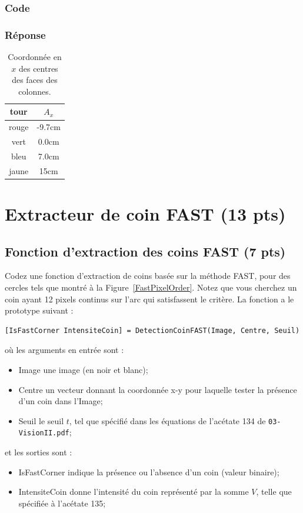 \documentclass[12pt]{article}
\begin{document}
\subsubsection{Code}
\subsubsection{Réponse}

\begin{table}[h]
\caption{Coordonnée en $x$ des centres des faces des colonnes.}
\label{TableX}
\begin{center}
\begin{tabular}{|c|c|}
\hline
 tour   &  $A_x$ \\
\hline
 rouge  &  -9.7cm     \\
 vert   &  0.0cm  \\
 bleu   &  7.0cm    \\
 jaune  &  15cm     \\
\hline
\end{tabular}
\end{center}
\end{table}


\newpage
\section{Extracteur de coin FAST (13 pts)}
 \label{SectionFAST}

\subsection{Fonction d'extraction des coins FAST (7 pts)}
Codez une fonction d'extraction de coins basée sur la méthode FAST, pour des cercles tels que montré à la Figure~\ref{FastPixelOrder}. Notez que vous cherchez un coin ayant 12 pixels continus sur l'arc qui satisfassent le critère. La fonction a le prototype suivant :
\vspace{-0.22in}
\begin{lstlisting}
[IsFastCorner IntensiteCoin] = DetectionCoinFAST(Image, Centre, Seuil)
\end{lstlisting}
où les arguments en entrée sont :
\begin{itemize}
\item {Image} une image (en noir et blanc);
\item {Centre} un vecteur donnant la coordonnée x-y pour laquelle tester la présence d'un coin dans l'{Image};
\item {Seuil} le seuil $t$, tel que spécifié dans les équations de l'acétate 134 de \texttt{03-VisionII.pdf};
\end{itemize}
et les sorties sont :
\begin{itemize}
\item {IsFastCorner} indique la présence ou l'absence d'un coin (valeur binaire);
\item {IntensiteCoin} donne l'intensité du coin représenté par la somme $V$, telle que spécifiée à l'acétate 135;
\end{itemize}
\end{document}
